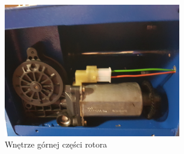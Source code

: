 \begin{figure}[!htbp]
 \includegraphics[width=0.7\textwidth]{rotor_gora}
 \centering
 \caption{Wnętrze górnej części rotora}
 \label{rotgora}
\end{figure}
